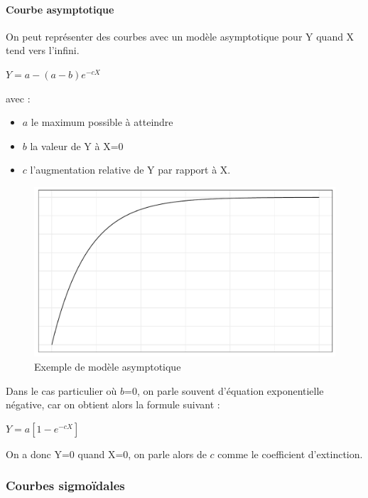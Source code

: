 \documentclass[
]{article}
\providecommand{\tightlist}{%
  \setlength{\itemsep}{0pt}\setlength{\parskip}{0pt}}
\begin{document}
\hypertarget{courbe-asymptotique}{%
\paragraph{Courbe asymptotique}\label{courbe-asymptotique}}

On peut représenter des courbes avec un modèle asymptotique pour Y quand
X tend vers l'infini.

\(Y=a-(a-b)e^{-cX}\)

avec :

\begin{itemize}
\tightlist
\item
  \(a\) le maximum possible à atteindre
\item
  \(b\) la valeur de Y à X=0
\item
  \(c\) l'augmentation relative de Y par rapport à X.
\end{itemize}

\begin{figure}
\centering
\includegraphics{Learning_R_files/figure-latex/unnamed-chunk-11-1.pdf}
\caption{Exemple de modèle asymptotique}
\end{figure}

Dans le cas particulier où \(b\)=0, on parle souvent d'équation
exponentielle négative, car on obtient alors la formule suivant :

\(Y=a[1-e^{-cX}]\)

On a donc Y=0 quand X=0, on parle alors de \(c\) comme le coefficient
d'extinction.

\hypertarget{courbes-sigmouxefdales}{%
\subsubsection{Courbes sigmoïdales}\label{courbes-sigmouxefdales}}
\end{document}
